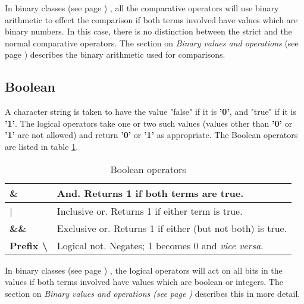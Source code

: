 In  binary classes (see page \pageref{refbincla}) , all the comparative operators
will use binary arithmetic to effect the comparison if both terms
involved have values which are binary numbers.
In this case, there is no distinction between the strict and the normal
comparative operators.
The section on  \emph{Binary values and operations} (see page \pageref{refbinary}) 
describes the binary arithmetic used for comparisons.
\subsection{Boolean}
\index{,}
A character string is taken to have the value "false" if it
is \textbf{'0'}, and "true" if it is \textbf{'1'}.
The logical operators take one or two such values (values other
than \textbf{'0'} or \textbf{'1'} are not allowed) and
return \textbf{'0'} or \textbf{'1'} as appropriate. The Boolean
operators are listed in table \ref{table:Boolean Comparators}.
\begin{table}\caption{Boolean operators}\label{table:Boolean Comparators}
\begin{tabularx}{\textwidth}{>{\bfseries}lX}
\toprule
\&&And. Returns 1 if both terms are true.
\\\midrule
|&Inclusive or. Returns 1 if either term is true.
\\\midrule
\&\&&Exclusive or. Returns 1 if either (but not both) is true.
\\\midrule
Prefix \textbackslash &Logical not. Negates; 1 becomes 0 and
\emph{vice versa}.
\\\bottomrule
\end{tabularx}
\end{table}
In  binary classes (see page \pageref{refbincla}) , the logical operators will act on
all bits in the values if both terms involved have values which are
boolean or integers.
The section on  \emph{Binary values and operations (see page
  \pageref{refbinary})} describes this in more detail.
